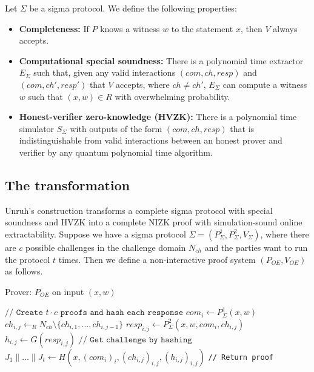 \documentclass{amsart}
\theoremstyle{plain}
\theoremstyle{remark}
\numberwithin{equation}{section}
\begin{document}
Let $\Sigma$ be a sigma protocol. We define the following properties:
\begin{itemize}
	\item
	{\bf Completeness:} If $P$ knows a witness $w$ to the statement $x$, then $V$ always accepts.

	\item
	{\bf Computational special soundness:} There is a polynomial time extractor $E_\Sigma$ such that, given any valid interactions $(com,ch,resp)$ and $(com, ch', resp')$ that $V$ accepts, where $ch \neq ch'$, $E_\Sigma$ can compute a witness $w$ such that $(x,w) \in R$ with overwhelming probability.

	\item
	{\bf Honest-verifier zero-knowledge (HVZK):} There is a polynomial time simulator $S_\Sigma$ with outputs of the form $(com, ch, resp)$ that is indistinguishable from valid interactions between an honest prover and verifier by any quantum polynomial time algorithm.

\end{itemize}

\subsection{The transformation}
Unruh's construction transforms a complete sigma protocol with special soundness and HVZK into a complete NIZK proof with simulation-sound online extractability. Suppose we have a sigma protocol $\Sigma = (P_\Sigma^1, P_\Sigma^2, V_\Sigma)$, where there are $c$ possible challenges in the challenge domain $N_{ch}$ and the parties want to run the protocol $t$ times.  Then we define a non-interactive proof system $(P_{OE}, V_{OE})$ as follows.

\begin{algorithm}
\caption*{Prover: $P_{OE}$ on input $(x,w)$}
\begin{algorithmic}
\STATE $\texttt{// Create $t\cdot c$ proofs and hash each response}$
	\STATE $com_i \leftarrow P_\Sigma^1(x,w)$
		\STATE $ch_{i,j} \leftarrow_R N_{ch} \setminus \{ch_{i,1},\dots,ch_{i,j-1}\}$
		\STATE $resp_{i,j} \leftarrow P_\Sigma^2(x,w,com_i, ch_{i,j})$
		\STATE $h_{i,j} \leftarrow G(resp_{i,j})$
	\ENDFOR
\ENDFOR
\vspace{2mm}
\STATE $\texttt{// Get challenge by hashing}$
\STATE $J_1 \| \dots \| J_t \leftarrow H(x, (com_i)_i, (ch_{i,j})_{i,j}, (h_{i,j})_{i,j})$ 
\vspace{2mm}
\STATE \texttt{// Return proof}
\end{algorithmic}
\end{algorithm}
\end{document}
